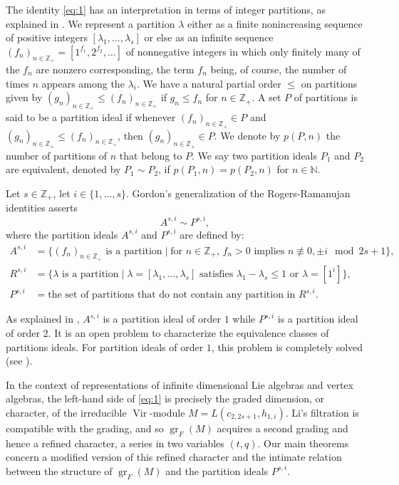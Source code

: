 \documentclass[a4paper, 12pt, reqno]{amsart}
\theoremstyle{remark}
\DeclareMathOperator{\Vir}{Vir}
\DeclareMathOperator{\gr}{gr}
\begin{document}
The identity \eqref{eq:1} has an interpretation in terms of integer partitions, as explained in \cite[\S8]{andrews_theory_1998}.
We represent a partition $\lambda$ either as a finite nonincreasing sequence of positive integers $[\lambda_1, \dots, \lambda_s]$ or else as an infinite sequence $(f_n)_{n \in \mathbb{Z}_+} = [1^{f_1}, 2^{f_2}, \dots]$ of nonnegative integers in which only finitely many of the $f_n$ are nonzero corresponding, the term $f_n$ being, of course, the number of times $n$ appears among the $\lambda_i$.
We have a natural partial order $\le$ on partitions given by $(g_n)_{n \in \mathbb{Z}_+} \le (f_n)_{n \in \mathbb{Z}_+}$ if $g_n \le f_n$ for $n \in \mathbb{Z}_+$.
A set $P$ of partitions is said to be a partition ideal if whenever $(f_n)_{n \in \mathbb{Z}_+} \in P$ and $(g_n)_{n \in \mathbb{Z}_+} \le (f_n)_{n \in \mathbb{Z}_+}$, then $(g_n)_{n \in \mathbb{Z}_+} \in P$.
We denote by $p(P, n)$ the number of partitions of $n$ that belong to $P$.
We say two partition ideals $P_1$ and $P_2$ are equivalent, denoted by $P_1 \sim P_2$, if $p(P_1, n) = p(P_2, n)$ for $n \in \mathbb{N}$.

Let $s \in \mathbb{Z}_+$, let $i \in \{1, \dots, s\}$.
Gordon's generalization of the Rogers-Ramanujan identities asserts
\begin{equation*}
  A^{s, i} \sim P^{s, i},
\end{equation*}
where the partition ideals $A^{s, i}$ and $P^{s, i}$ are defined by:
\begin{align*}
  A^{s, i} &= \{\text{$(f_n)_{n \in \mathbb{Z}_+}$ is a partition} \mid \text{for $n \in \mathbb{Z}_+$, $f_n > 0$ implies $n \not\equiv 0, \pm i \mod 2s + 1$}\}, \\
  R^{s, i} &= \{\text{$\lambda$ is a partition} \mid \text{$\lambda = [\lambda_1, \dots, \lambda_s]$ satisfies $\lambda_1 - \lambda_s \le 1$ or $\lambda = [1^i]$}\}, \\
  P^{s, i} &= \text{the set of partitions that do not contain any partition in $R^{s, i}$}.
\end{align*}

As explained in \cite[\S8]{andrews_theory_1998}, $A^{s, i}$ is a partition ideal of order $1$ while $P^{s, i}$ is a partition ideal of order $2$.
It is an open problem to characterize the equivalence classes of partitions ideals.
For partition ideals of order $1$, this problem is completely solved (see \cite[Theorem 8.4]{andrews_theory_1998}).

In the context of representations of infinite dimensional Lie algebras and vertex algebras, the left-hand side of \eqref{eq:1} is precisely the graded dimension, or character, of the irreducible $\Vir$-module $M = L(c_{2, 2s + 1}, h_{1, i})$.
Li's filtration is compatible with the grading, and so $\gr_F(M)$ acquires a second grading and hence a refined character, a series in two variables $(t, q)$.
Our main theorems concern a modified version of this refined character and the intimate relation between the structure of $\gr_F(M)$ and the partition ideals $P^{s, i}$.
\end{document}
